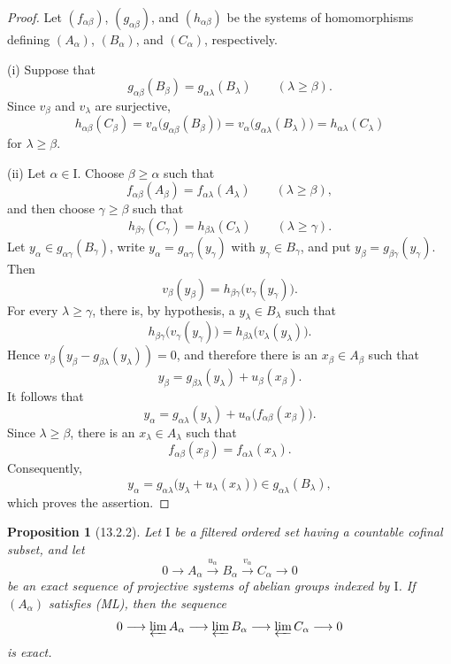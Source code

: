 \documentclass[oneside]{amsart}
\theoremstyle{ega-env-style}
\theoremstyle{ega-thm-env-style}
\newtheorem*{proposition}{Proposition}
\theoremstyle{ega-defn-env-style}
\def\geq{\geqslant}                 %
\newcommand{\oldpage}[2][]{{\marginnote{\normalfont{\textbf{#1}~|~#2}}}\ignorespaces}
\let\EGAOriginalLabel\label
\renewcommand{\label}[1]{\phantomsection\EGAOriginalLabel{#1}}
\begin{document}
\begin{proof}
Let $(f_{\alpha\beta})$, $(g_{\alpha\beta})$, and
$(h_{\alpha\beta})$ be the systems of homomorphisms defining
$(A_\alpha)$, $(B_\alpha)$, and $(C_\alpha)$, respectively.

(i) Suppose that
\[
  g_{\alpha\beta}(B_\beta)
  =
  g_{\alpha\lambda}(B_\lambda)
  \qquad(\lambda\geq\beta).
\]
Since $v_\beta$ and $v_\lambda$ are surjective,
\[
  h_{\alpha\beta}(C_\beta)
  =
  v_\alpha\bigl(g_{\alpha\beta}(B_\beta)\bigr)
  =
  v_\alpha\bigl(g_{\alpha\lambda}(B_\lambda)\bigr)
  =
  h_{\alpha\lambda}(C_\lambda)
\]
for $\lambda\geq\beta$.

(ii) Let $\alpha\in\mathrm{I}$.
Choose $\beta\geq\alpha$ such that
\[
  f_{\alpha\beta}(A_\beta)
  =
  f_{\alpha\lambda}(A_\lambda)
  \qquad(\lambda\geq\beta),
\]
and then choose $\gamma\geq\beta$ such that
\[
  h_{\beta\gamma}(C_\gamma)
  =
  h_{\beta\lambda}(C_\lambda)
  \qquad(\lambda\geq\gamma).
\]
Let $y_\alpha\in g_{\alpha\gamma}(B_\gamma)$, write
$y_\alpha=g_{\alpha\gamma}(y_\gamma)$ with $y_\gamma\in B_\gamma$,
and put $y_\beta=g_{\beta\gamma}(y_\gamma)$.
Then
\[
  v_\beta(y_\beta)
  =
  h_{\beta\gamma}\bigl(v_\gamma(y_\gamma)\bigr).
\]
For every $\lambda\geq\gamma$, there is, by hypothesis, a
$y_\lambda\in B_\lambda$ such that
\[
  h_{\beta\gamma}\bigl(v_\gamma(y_\gamma)\bigr)
  =
  h_{\beta\lambda}\bigl(v_\lambda(y_\lambda)\bigr).
\]
Hence
$v_\beta(y_\beta-g_{\beta\lambda}(y_\lambda))=0$, and therefore
there is an $x_\beta\in A_\beta$
\oldpage[0\textsubscript{III}]{66}
such that
\[
  y_\beta
  =
  g_{\beta\lambda}(y_\lambda)+u_\beta(x_\beta).
\]
It follows that
\[
  y_\alpha
  =
  g_{\alpha\lambda}(y_\lambda)
  +
  u_\alpha\bigl(f_{\alpha\beta}(x_\beta)\bigr).
\]
Since $\lambda\geq\beta$, there is an $x_\lambda\in A_\lambda$ such
that
\[
  f_{\alpha\beta}(x_\beta)=f_{\alpha\lambda}(x_\lambda).
\]
Consequently,
\[
  y_\alpha
  =
  g_{\alpha\lambda}
  \bigl(y_\lambda+u_\lambda(x_\lambda)\bigr)
  \in g_{\alpha\lambda}(B_\lambda),
\]
which proves the assertion.
\end{proof}

\begin{proposition}[13.2.2]
\label{0.13.2.2}
Let $\mathrm{I}$ be a filtered ordered set having a countable
cofinal subset, and let
\[
  0\longrightarrow A_\alpha
  \xrightarrow{u_\alpha}B_\alpha
  \xrightarrow{v_\alpha}C_\alpha
  \longrightarrow0
\]
be an exact sequence of projective systems of abelian groups indexed
by $\mathrm{I}$.
If $(A_\alpha)$ satisfies {\rm(ML)}, then the sequence
\[
  0\longrightarrow\varprojlim A_\alpha
  \longrightarrow\varprojlim B_\alpha
  \longrightarrow\varprojlim C_\alpha
  \longrightarrow0
\]
is exact.
\end{proposition}
\end{document}
